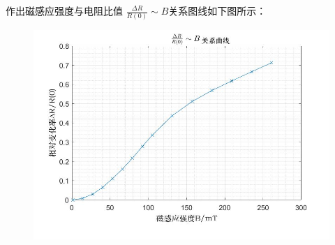 \documentclass[UTF8]{ctexart}
\begin{document}
作出磁感应强度与电阻比值  $\frac{\Delta R}{R(0)} \sim B  $关系图线如下图所示：

\begin{figure}[H]
  \centering
  \includegraphics[scale=0.5]{拟合5.jpg}
\end{figure}
\end{document}
